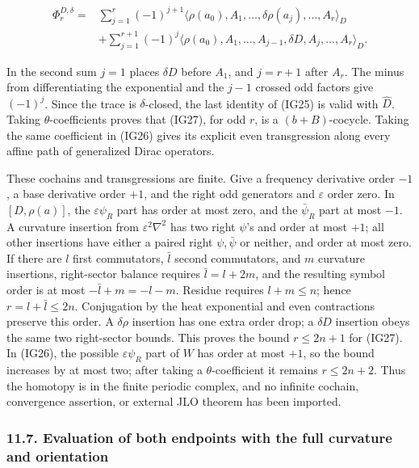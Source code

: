 \documentclass[
  11pt,
]{article}
\begin{document}
\[
\begin{split}
 \Phi_r^{D,\delta}={}&
  \sum_{j=1}^r(-1)^{j+1}
   \langle\rho(a_0),A_1,\ldots,\delta\rho(a_j),\ldots,A_r\rangle_D\\
 &+\sum_{j=1}^{r+1}(-1)^j
   \langle\rho(a_0),A_1,\ldots,A_{j-1},
                  \delta D,A_j,\ldots,A_r\rangle_D.
\end{split}
\tag{IG27}
\]

In the second sum \(j=1\) places \(\delta D\) before \(A_1\), and
\(j=r+1\) after \(A_r\). The minus from differentiating the exponential
and the \(j-1\) crossed odd factors give \((-1)^j\). Since the trace is
\(\delta\)-closed, the last identity of (IG25) is valid with
\(\widehat D\). Taking \(\theta\)-coefficients proves that (IG27), for
odd \(r\), is a \((b+B)\)-cocycle. Taking the same coefficient in (IG26)
gives its explicit even transgression along every affine path of
generalized Dirac operators.

These cochains and transgressions are finite. Give a frequency
derivative order \(-1\), a base derivative order \(+1\), and the right
odd generators and \(\varepsilon\) order zero. In \([D,\rho(a)]\), the
\(\varepsilon\psi_R\) part has order at most zero, and the
\(\bar\psi_R\) part at most \(-1\). A curvature insertion from
\(\varepsilon^2\nabla^2\) has two right \(\psi\)'s and order at most
\(+1\); all other insertions have either a paired right
\(\psi,\bar\psi\) or neither, and order at most zero. If there are \(l\)
first commutators, \(\bar l\) second commutators, and \(m\) curvature
insertions, right-sector balance requires \(\bar l=l+2m\), and the
resulting symbol order is at most \(-\bar l+m=-l-m\). Residue requires
\(l+m\leq n\); hence \(r=l+\bar l\leq2n\). Conjugation by the heat
exponential and even contractions preserve this order. A \(\delta\rho\)
insertion has one extra order drop; a \(\delta D\) insertion obeys the
same two right-sector bounds. This proves the bound \(r\leq2n+1\) for
(IG27). In (IG26), the possible \(\varepsilon\psi_R\) part of \(W\) has
order at most \(+1\), so the bound increases by at most two; after
taking a \(\theta\)-coefficient it remains \(r\leq2n+2\). Thus the
homotopy is in the finite periodic complex, and no infinite cochain,
convergence assertion, or external JLO theorem has been imported.

\subsubsection{11.7. Evaluation of both endpoints with the full
curvature and
orientation}\label{evaluation-of-both-endpoints-with-the-full-curvature-and-orientation}
\end{document}
